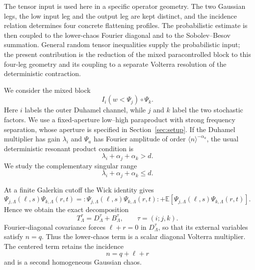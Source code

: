 \documentclass[11pt,reqno]{amsart}
\numberwithin{equation}{section}
\theoremstyle{plain}
\theoremstyle{definition}
\newcommand{\E}{\mathbb E}
\newcommand{\wick}[1]{:#1:}
\begin{document}
The tensor input is used here in a specific operator geometry.  The two
Gaussian legs, the low input leg and the output leg are kept distinct, and
the incidence relation determines four concrete flattening profiles.  The
probabilistic estimate is then coupled to the lower-chaos Fourier diagonal
and to the Sobolev--Besov summation.  General random tensor inequalities
supply the probabilistic input; the present contribution is the reduction
of the mixed paracontrolled block to this four-leg geometry and its coupling
to a separate Volterra resolution of the deterministic contraction.

We consider the mixed block
\begin{equation}\label{eq:intro-block}
        I_i(w<\Psi_j)\circ\Psi_k .
\end{equation}
Here \(i\) labels the outer Duhamel channel, while \(j\) and \(k\) label the
two stochastic factors.  We use a fixed-aperture low--high paraproduct with
strong frequency separation,
whose aperture is specified in Section~\ref{sec:setup}.  If the Duhamel
multiplier has gain \(\lambda_i\) and \(\Psi_a\) has Fourier amplitude of
order \(\langle n\rangle^{-\alpha_a}\), the usual deterministic resonant
product condition is
\[
        \lambda_i+\alpha_j+\alpha_k>d.
\]
We study the complementary singular range
\begin{equation}\label{eq:det-threshold}
        \lambda_i+\alpha_j+\alpha_k\le d .
\end{equation}

At a finite Galerkin cutoff the Wick identity gives
\begin{equation}\label{eq:intro-wick}
        \Psi_{j,\Lambda}(\ell,s)\Psi_{k,\Lambda}(r,t)
        =\wick{\Psi_{j,\Lambda}(\ell,s)\Psi_{k,\Lambda}(r,t)}
        +\E[\Psi_{j,\Lambda}(\ell,s)\Psi_{k,\Lambda}(r,t)].
\end{equation}
Hence we obtain the exact decomposition
\[
        T^\tau_\Lambda=D^\tau_\Lambda+B^\tau_\Lambda,
        \qquad \tau=(i;j,k).
\]
Fourier-diagonal covariance forces \(\ell+r=0\) in \(D^\tau_\Lambda\),
so that its external variables satisfy \(n=q\).  Thus the lower-chaos term
is a scalar diagonal Volterra multiplier.  The centered term retains the
incidence
\begin{equation}\label{eq:intro-incidence}
        n=q+\ell+r
\end{equation}
and is a second homogeneous Gaussian chaos.
\end{document}
